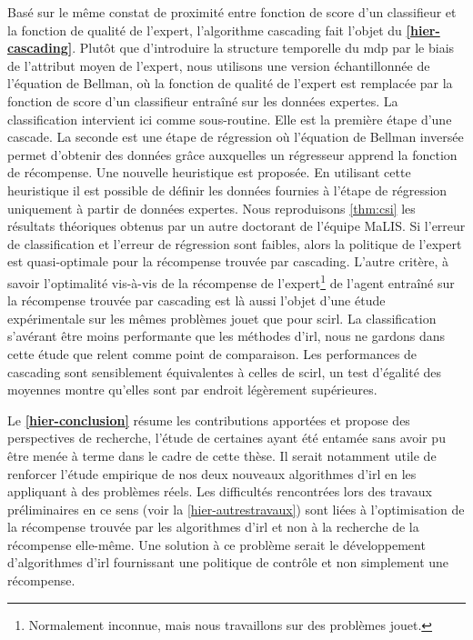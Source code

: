 \documentclass[frenchb,a4paper,justified,notoc]{tufte-book}
\begin{document}
Basé sur le même constat de proximité entre fonction de score d'un classifieur et la fonction de qualité de l'expert, l'algorithme \gls{cascading} fait l'objet du \textbf{\autoref{hier-cascading}}. Plutôt que d'introduire la structure temporelle du \gls{mdp} par le biais de l'attribut moyen de l'expert, nous utilisons une version échantillonnée de l'équation de Bellman, où la fonction de qualité de l'expert est remplacée par la fonction de score d'un classifieur entraîné sur les données expertes. La classification intervient ici comme sous-routine. Elle est la première étape d'une cascade. La seconde est une étape de régression où l'équation de Bellman inversée permet d'obtenir des données grâce auxquelles un régresseur apprend la fonction de récompense. Une nouvelle heuristique est proposée. En utilisant cette heuristique il est possible de définir les données fournies à l'étape de régression uniquement à partir de données expertes. Nous reproduisons \autoref{thm:csi} les résultats théoriques obtenus par un autre doctorant de l'équipe MaLIS. Si l'erreur de classification et l'erreur de régression sont faibles, alors la politique de l'expert est quasi-optimale pour la récompense trouvée par \gls{cascading}. L'autre critère, à savoir l'optimalité vis-à-vis de la récompense de l'expert\footnote{Normalement inconnue, mais nous travaillons sur des problèmes jouet.
 } de l'agent entraîné sur la récompense trouvée par \gls{cascading} est là aussi l'objet d'une étude expérimentale sur les mêmes problèmes jouet que pour \gls{scirl}. La classification s'avérant être moins performante que les méthodes d'\gls{irl}, nous ne gardons dans cette étude que \gls{relent} comme point de comparaison. Les performances de \gls{cascading} sont sensiblement équivalentes à celles de \gls{scirl}, un test d'égalité des moyennes montre qu'elles sont par endroit légèrement supérieures.


Le \textbf{\autoref{hier-conclusion}} résume les contributions apportées et propose des perspectives de recherche, l'étude de certaines ayant été entamée sans avoir pu être menée à terme dans le cadre de cette thèse. Il serait notamment utile de renforcer l'étude empirique de nos deux nouveaux algorithmes d'\gls{irl} en les appliquant à des problèmes réels. Les difficultés rencontrées lors des travaux préliminaires en ce sens (voir la \autoref{hier-autrestravaux}) sont liées à l'optimisation de la récompense trouvée par les algorithmes d'\gls{irl} et non à la recherche de la récompense elle-même. Une solution à ce problème serait le développement d'algorithmes d'\gls{irl} fournissant une politique de contrôle et non simplement une récompense.
 
\end{document}
